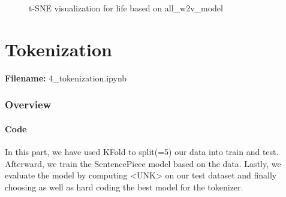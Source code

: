 \documentclass[12pt, a4paper]{article}
\begin{document}
\begin{itemize}
		\begin{figure}[H]
			\caption{t-SNE visualization for life based on all\_w2v\_model}
			\label{word2vec_all_life}
		\end{figure}
		
	\end{itemize}
	

	
	\newpage
	\part{Tokenization}
	\large{\textbf{Filename:} 4\_tokenization.ipynb}
	\section{Overview}
	
	\subsection{Code}
	In this part, we have used KFold to split(=5) our data into train and test. Afterward, we train the SentencePiece model based on the data. Lastly, we evaluate the model by computing <UNK> on our test dataset and finally choosing as well as hard coding the best model for the tokenizer. 
	
\end{document}
